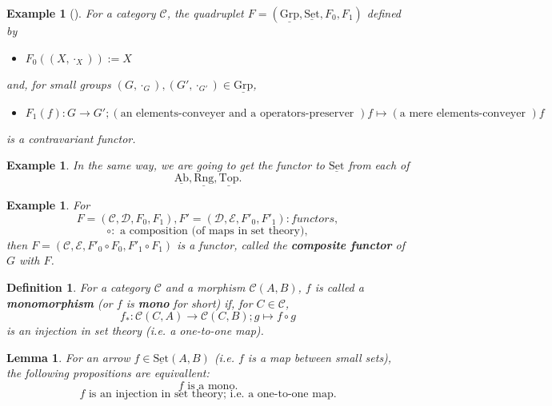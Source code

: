\documentclass[dvipdfmx,10pt,notheorems]{beamer}
\newtheorem{definition}[theorem]{Definition}
\newtheorem{example}[theorem]{Example}
\newtheorem{lemma}[theorem]{Lemma}
\renewcommand{\#}{^\sharp}
\begin{document}
	\begin{frame}
			\begin{example}[]
					For a category $\mathcal{C}$, the quadruplet $F=(\underline{\mathrm{Grp}},
					\underline{\mathrm{Set}},
					F_0,F_1)$ defined by
							\begin{itemize}
									\item $F_0((X,\cdot_X)):=X$
							\end{itemize}
					and, for small groups $(G,\cdot_G),(G',\cdot_{G'})\in\underline{\mathrm{Grp}}$,
							\begin{itemize}
									\item $F_1(f):G\rightarrow G' ;(\mbox{an elements-conveyer and a operators-preserver })f
									\mapsto (\mbox{a mere elements-conveyer })f
									$
							\end{itemize}
					is a contravariant functor.
			\end{example}
			\begin{example}
					In the same way, we are going to get the functor to $\underline{\mathrm{Set}}$ from each of
					$$\underline{\mathrm{Ab}},\underline{\mathrm{Rng}},\underline{\mathrm{Top}}.$$		
			\end{example}
	\end{frame}
	
	
	
	\begin{frame}
			\begin{example}
					For
					$$F=(\mathcal{C},\mathcal{D},F_0,F_1), F'=(\mathcal{D},\mathcal{E},F'_0,F'_1):functors,$$
					$$\circ:\mbox{ a composition (of maps in set theory)},$$
					then $F=(\mathcal{C},\mathcal{E},F'_0\circ F_0,F'_1\circ F_1)$ is a functor, called the
					{\bf composite functor }of $G$ with $F$.
			\end{example}
	\end{frame}
	
	
	
	\begin{frame}
			\begin{definition}
					For a category $\mathcal{C}$ and a morphism $\mathcal{C}(A,B)$,
					$f$ is called a {\bf monomorphism} (or $f$ is {\bf mono} for short) if, for
					$C\in\mathcal{C}$, $$f_*:\mathcal{C}(C,A)\rightarrow\mathcal{C}(C,B);g\mapsto f\circ g$$
					is an injection in set theory (i.e. a one-to-one map).
			\end{definition}
	\end{frame}
	
	
	\begin{frame}
			\begin{lemma}
					For an arrow $f\in \underline{\mathrm{Set}}(A,B)$ (i.e. $f$ is a map between small sets),
					the following propositions are equivallent:
							$$f \mbox{ is a mono}.$$
							$$f \mbox{ is an injection in set theory; i.e. a one-to-one map}.$$
							
			\end{lemma}
	\end{frame}
\end{document}
